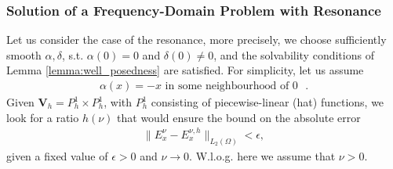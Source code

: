 \subsubsection{Solution of a Frequency-Domain Problem with Resonance}
Let us consider the case of the resonance, more precisely, we choose sufficiently smooth
$\alpha,\delta$, s.t. $\alpha(0)=0$ and $\delta(0)\neq 0$, and the solvability conditions 
of Lemma \ref{lemma:well_posedness}  are satisfied. 
For simplicity, let us assume 
\begin{align}
\label{eq:cond}
 \alpha(x)=-x \text{  in some neighbourhood of $0$ }.
\end{align}
Given $\mathbf{V}_{h}=P_{h}^{1}\times P_{h}^{1}$, with $P_{h}^{1}$ consisting of piecewise-linear (hat) functions, 
we look for a ratio $h(\nu)$ that would ensure the bound on the absolute error 
\begin{align}
\label{eq:problem1}
\|E^{\nu}_{x}-E^{\nu,h}_{x}\|_{L_{2}(\Omega)}<\epsilon,
\end{align}
given a fixed value of $\epsilon>0$ and $\nu\rightarrow 0$. W.l.o.g. here we assume that $\nu>0$. 

